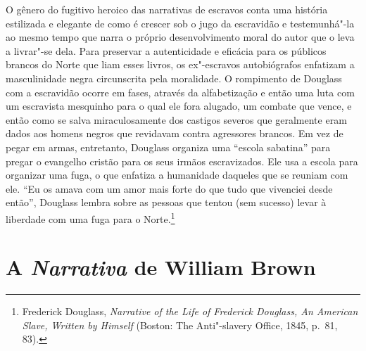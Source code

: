 O gênero do fugitivo heroico das narrativas de escravos conta uma
história estilizada e elegante de como é crescer sob o jugo da
escravidão e testemunhá"-la ao mesmo tempo que narra o próprio
desenvolvimento moral do autor que o leva a livrar"-se dela. Para
preservar a autenticidade e eficácia para os públicos brancos do Norte
que liam esses livros, os ex"-escravos autobiógrafos enfatizam a
masculinidade negra circunscrita pela moralidade. O rompimento de
Douglass com a escravidão ocorre em fases, através da alfabetização e
então uma luta com um escravista mesquinho para o qual ele fora alugado,
um combate que vence, e então como se salva miraculosamente dos castigos
severos que geralmente eram dados aos homens negros que revidavam contra
agressores brancos. Em vez de pegar em armas, entretanto, Douglass
organiza uma ``escola sabatina'' para pregar o evangelho cristão para os
seus irmãos escravizados. Ele usa a escola para organizar uma fuga, o
que enfatiza a humanidade daqueles que se reuniam com ele. ``Eu os amava
com um amor mais forte do que tudo que vivenciei desde então'', Douglass
lembra sobre as pessoas que tentou (sem sucesso) levar à liberdade com
uma fuga para o Norte.\footnote{Frederick Douglass, \emph{Narrative of
  the Life of Frederick Douglass, An American Slave, Written by Himself}
  (Boston: The Anti"-slavery Office, 1845, p.~81, 83).}

\section{A \emph{Narrativa} de William Brown}

